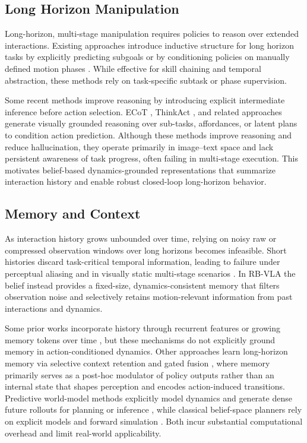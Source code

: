 \documentclass[12pt]{article}
\begin{document}
\subsection{Long Horizon Manipulation}
Long-horizon, multi-stage manipulation requires policies to reason over extended interactions. Existing approaches introduce inductive structure for long horizon tasks by explicitly predicting subgoals \cite{yang2025lohovla} or by conditioning policies on manually defined motion phases \cite{fan2025long}. While effective for skill chaining and temporal abstraction, these methods rely on task-specific subtask or phase supervision.

Some recent methods improve reasoning by introducing explicit intermediate inference before action selection. ECoT \cite{zawalski2024robotic}, ThinkAct \cite{huang2507thinkact}, and related approaches \cite{zhao2025cot,li2025coa} generate visually grounded reasoning over sub-tasks, affordances, or latent plans to condition action prediction. Although these methods improve reasoning and reduce hallucination, they operate primarily in image--text space and lack persistent awareness of task progress, often failing in multi-stage execution. This motivates belief-based dynamics-grounded representations that summarize interaction history and enable robust closed-loop long-horizon behavior.

\subsection{Memory and Context}
As interaction history grows unbounded over time, relying on noisy raw or compressed observation windows over long horizons becomes infeasible. Short histories discard task-critical temporal information, leading to failure under perceptual aliasing and in visually static multi-stage scenarios \cite{spaan2012partially}. In RB-VLA the belief instead provides a fixed-size, dynamics-consistent memory that filters observation noise and selectively retains motion-relevant information from past interactions and dynamics.

Some prior works incorporate history through recurrent features \cite{xiao2025ava} or growing memory tokens over time \cite{koo2025hamlet}, but these mechanisms do not explicitly ground memory in action-conditioned dynamics. Other approaches learn long-horizon memory via selective context retention and gated fusion \cite{liu2025evovla}, where memory primarily serves as a post-hoc modulator of policy outputs rather than an internal state that shapes perception and encodes action-induced transitions. Predictive world-model methods explicitly model dynamics and generate dense future rollouts for planning or inference \cite{cen2025rynnvla, liu2025trivla}, while classical belief-space planners rely on explicit models and forward simulation \cite{kaelbling2013integrated}. Both incur substantial computational overhead and limit real-world applicability.
\end{document}
